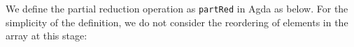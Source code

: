 \documentclass{l4proj}
\begin{document}
We define the partial reduction operation as \texttt{partRed} in Agda as below. For the simplicity of the definition, we do not consider the reordering of elements in the array at this stage:
\begin{code}%
\>[0]\<%
\\
\>[0]\AgdaSpace{}%
\AgdaSymbol{:}%
\>[496I]\AgdaSymbol{(}\AgdaSpace{}%
\AgdaSymbol{:}\AgdaSpace{}%
\AgdaSymbol{)}\AgdaSpace{}%
\AgdaSpace{}%
\AgdaSymbol{\{}\AgdaSpace{}%
\AgdaSymbol{:}\AgdaSpace{}%
\AgdaSymbol{\}}\AgdaSpace{}%
\AgdaSpace{}%
\AgdaSymbol{\{}\AgdaSpace{}%
\AgdaSymbol{:}\AgdaSpace{}%
\AgdaSymbol{\}}\AgdaSpace{}%
\<%
\\
\>[.][@{}l@{}]\<[496I]%
\>[10]\AgdaSymbol{(}\AgdaSpace{}%
\AgdaSymbol{:}\AgdaSpace{}%
\AgdaSpace{}%
\AgdaSymbol{)}\AgdaSpace{}%
\AgdaSpace{}%
\AgdaSpace{}%
\AgdaSpace{}%
\AgdaSymbol{(}\AgdaSpace{}%
\AgdaSpace{}%
\AgdaOperator{\AgdaPrimitive{*}}\AgdaSpace{}%
\AgdaSymbol{)}\AgdaSpace{}%
\AgdaSpace{}%
\AgdaSpace{}%
\AgdaSpace{}%
\AgdaSymbol{(}\AgdaSpace{}%
\AgdaSymbol{)}\<%
\\
\>[0]\AgdaSpace{}%
\AgdaSpace{}%
\AgdaSymbol{\{}\AgdaSymbol{\}}\AgdaSpace{}%
\AgdaSpace{}%
\AgdaInductiveConstructor{[]}\AgdaSpace{}%
\AgdaSymbol{=}%
\>[528I]\AgdaSpace{}%
\AgdaSpace{}%
\AgdaSymbol{=}\AgdaSpace{}%
\AgdaSpace{}%
\<%
\\
\>[.][@{}l@{}]\<[528I]%
\>[27]\AgdaSpace{}%
\AgdaOperator{\AgdaFunction{[}}\AgdaSpace{}%
\AgdaSpace{}%
\AgdaOperator{\AgdaFunction{]}}\<%
\\
\>[0]\AgdaSpace{}%
\AgdaSymbol{(}\AgdaSpace{}%
\AgdaSymbol{)}\AgdaSpace{}%
\AgdaSymbol{\{}\AgdaSymbol{\}}\AgdaSpace{}%
\AgdaSpace{}%
\AgdaSpace{}%
\AgdaSymbol{=}\AgdaSpace{}%
\AgdaOperator{\AgdaFunction{[}}\AgdaSpace{}%
\AgdaSpace{}%
\AgdaSpace{}%
\AgdaSpace{}%

\end{code}
\end{document}
